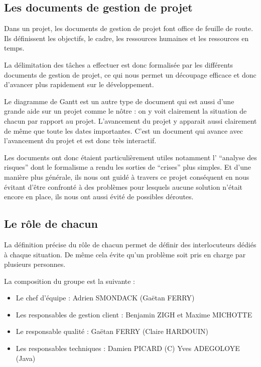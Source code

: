 \subsection{Les documents de gestion de projet}

Dans un projet, les documents de gestion de projet font office de feuille de route. Ils définissent les objectifs, le cadre, les ressources humaines et les ressources en temps.

La délimitation des tâches a effectuer est donc formalisée par les différents documents de gestion de projet, ce qui nous permet un découpage efficace et donc d'avancer plus rapidement sur le développement.

Le diagramme de Gantt est un autre type de document qui est aussi d'une grande aide sur un projet comme le nôtre : on y voit clairement la situation de chacun par rapport au projet. L'avancement du projet y apparait aussi clairement de même que toute les dates importantes.
C'est un document qui avance avec l'avancement du projet et est donc très interactif.

Les documents ont donc étaient particulièrement utiles notamment l' ``analyse des risques'' dont le formalisme a rendu les sorties de ``crises'' plus simples. 
Et d'une manière plus générale, ils nous ont guidé à travers ce projet conséquent en nous évitant d'être confronté à des problèmes pour lesquels aucune solution n'était encore en place, ils nous ont aussi évité de possibles déroutes.

\subsection{Le rôle de chacun}

La définition précise du rôle de chacun permet de définir des interlocuteurs dédiés à chaque situation.
De même cela évite qu'un problème soit pris en charge par plusieurs personnes.

La composition du groupe est la suivante :
\begin{itemize}
\item Le chef d'équipe : Adrien SMONDACK (Gaëtan FERRY)
\item Les responsables de gestion client : Benjamin ZIGH et Maxime MICHOTTE
\item Le responsable qualité : Gaëtan FERRY (Claire HARDOUIN)
\item Les responsables techniques : Damien PICARD (C) Yves ADEGOLOYE (Java)
\end{itemize}

